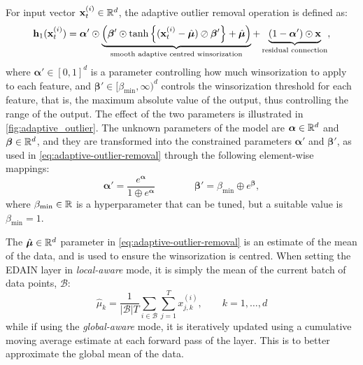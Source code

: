 \documentclass{statsmsc}
\begin{document}
For input vector $\mathbf{x}_t^{(i)} \in \mathbb{R}^d$, the adaptive outlier removal operation is defined as:
\begin{equation}\label{eq:adaptive-outlier-removal}
    \mathbf{h}_1(\mathbf{x}_t^{(i)})=\bm\alpha' \odot \underbrace{\left(\bm\beta' \odot 
        \tanh\left\{(\mathbf{x}_t^{(i)}-\hat{\bm\mu}) \oslash \bm\beta'  \right\}+\hat{\bm\mu}
\right)}_{\text{smooth adaptive centred winsorization}}
    +\underbrace{\left(1-\bm\alpha' \right) \odot \mathbf{x}}_{\text{residual connection}},
\end{equation}
where
$\bm\alpha' \in [0,1]^d$ is a parameter controlling how much winsorization to apply to each feature,
and $\bm\beta' \in [\beta_{\text{min}},\infty)^d$ controls the winsorization threshold for
each feature, that is, the maximum absolute value of the output, thus controlling the range of the
output. The effect of the two parameters is illustrated in \cref{fig:adaptive_outlier}.
The unknown parameters of the model are $\bm\alpha \in \mathbb{R}^d$ and $\bm\beta \in \mathbb{R}^d$, and they
are transformed into the constrained parameters $\bm\alpha'$ and $\bm\beta'$, as used in
\cref{eq:adaptive-outlier-removal} through the following element-wise mappings:
\begin{equation}
    \bm\alpha'=\frac{e^{\bm\alpha}}{1\oplus e^{\bm\alpha}} \qquad\qquad
    \bm\beta'=\beta_{\text{min}}\oplus e^{\bm\beta},
\end{equation}
where $\beta_{\textrm{min}} \in \mathbb{R}$ is a hyperparameter that can be tuned, but a suitable value is $\beta_{\textrm{min}}=1$.


The $\hat{\bm\mu}\in \mathbb{R}^d$ parameter in \cref{eq:adaptive-outlier-removal} is an estimate of the mean of the data, and is used
to ensure the winsorization is centred. When setting the \ac{EDAIN} layer in \textit{local-aware}
mode, it is simply the mean of the current batch of data points, $\mathcal{B}$:
\begin{equation}
    \hat{\mu}_k=\frac{1}{|\mathcal{B}| T} \sum_{i \in \mathcal{B}} \sum_{j=1}^T x_{j,k}^{(i)}, \qquad k=1,\dots,d
\end{equation}
while if using the \textit{global-aware} mode, it is iteratively updated using a cumulative
moving average estimate at each forward pass of the layer. This is to better approximate the
global mean of the data.
\end{document}
